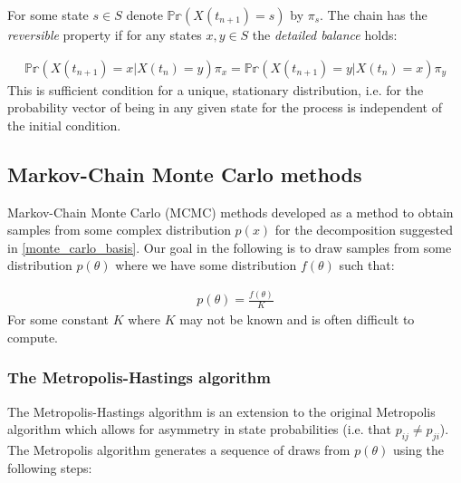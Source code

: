 \documentclass[11pt]{article} %
\begin{document}
For some state $s \in S$ denote $ \mathbb{Pr}(X(t_{n+1}) = s)$ by $\pi_s$. The chain has the \emph{reversible} property if for any states $x, y \in S$ the \emph{detailed balance} holds:

\begin{align}
 \mathbb{Pr}(X(t_{n+1}) = x | X(t_n) = y)  \pi_x  =  \mathbb{Pr}(X(t_{n+1}) = y | X(t_n) = x) \pi_y
\end{align}
This is sufficient condition for a unique, stationary distribution, i.e. for the probability vector of being in any given state for the process is independent of the initial condition.

\subsection{Markov-Chain Monte Carlo methods}
Markov-Chain Monte Carlo (MCMC) methods developed as a method to obtain samples from some complex distribution $p(x)$ for the decomposition suggested in \eqref{monte_carlo_basis}. Our goal in the following is to draw samples from some distribution $p(\theta)$ where we have some distribution $f(\theta)$ such that:

\begin{align}
p(\theta) = \frac{f(\theta)}{K} 
\end{align}
For some constant $K$ where $K$ may not be known and is often difficult to compute.

\subsubsection{The Metropolis-Hastings algorithm}
The Metropolis-Hastings algorithm \cite{HastingsMonteCarloSampling} is an extension to the original Metropolis algorithm which allows for asymmetry in state probabilities (i.e. that $p_{ij} \neq p_{ji}$). The Metropolis algorithm \cite{MetropolisMonteCarloMethod1949} \cite{MetropolisEquationStateCalculations1953} generates a sequence of draws from $p(\theta)$ using the following steps:
\end{document}
